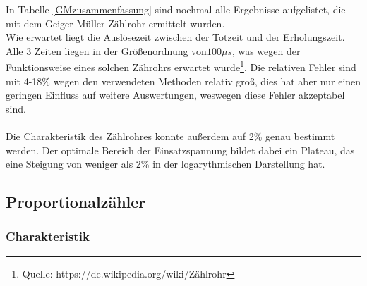 \documentclass[12pt,a4paper]{article}
\begin{document}
In Tabelle \ref{GMzusammenfassung} sind nochmal alle Ergebnisse aufgelistet, die mit dem Geiger-Müller-Zählrohr ermittelt wurden.\\
Wie erwartet liegt die Auslösezeit zwischen der Totzeit und der Erholungszeit. Alle 3 Zeiten liegen in der Größenordnung von$100\mu s$, was wegen der Funktionsweise eines solchen Zährohrs erwartet wurde\footnote{Quelle: https://de.wikipedia.org/wiki/Zählrohr}. Die relativen Fehler sind mit 4-18\% wegen den verwendeten Methoden relativ groß, dies hat aber nur einen geringen Einfluss auf weitere Auswertungen, weswegen diese Fehler akzeptabel sind.\\
\\
Die Charakteristik des Zählrohres konnte außerdem auf 2\% genau bestimmt werden. Der optimale Bereich der Einsatzspannung bildet dabei ein Plateau, das eine Steigung von weniger als 2\% in der logarythmischen Darstellung hat. 


\subsection{Proportionalzähler}

\subsubsection{Charakteristik}
\end{document}
